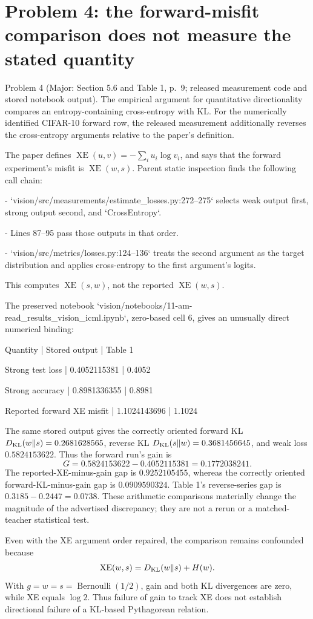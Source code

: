 \documentclass[10pt]{article}
\begin{document}
\section*{Problem 4: the forward-misfit comparison does not measure the stated quantity}
Problem 4 (Major: Section 5.6 and Table 1, p. 9; released measurement code and stored notebook output).  The empirical argument for quantitative directionality compares an entropy-containing cross-entropy with KL. For the numerically identified CIFAR-10 forward row, the released measurement additionally reverses the cross-entropy arguments relative to the paper’s definition.\par
The paper defines \(\operatorname{XE}(u,v)=-\sum_i u_i\log v_i\), and says that the forward experiment’s misfit is \(\operatorname{XE}(w,s)\). Parent static inspection finds the following call chain:\par
- `vision/src/measurements/estimate\_losses.py:272--275` selects weak output first, strong output second, and `CrossEntropy`.\par
- Lines 87–95 pass those outputs in that order.\par
- `vision/src/metrics/losses.py:124--136` treats the second argument as the target distribution and applies cross-entropy to the first argument’s logits.\par
This computes \(\operatorname{XE}(s,w)\), not the reported \(\operatorname{XE}(w,s)\).\par
The preserved notebook `vision/notebooks/11-am-read\_results\_vision\_icml.ipynb`, zero-based cell 6, gives an unusually direct numerical binding:\par
Quantity | Stored output | Table 1\par
Strong test loss | 0.4052115381 | 0.4052\par
Strong accuracy | 0.8981336355 | 0.8981\par
Reported forward XE misfit | 1.1024143696 | 1.1024\par
The same stored output gives the correctly oriented forward KL \(D_{\rm KL}(w\|s)=0.2681628565\), reverse KL \(D_{\rm KL}(s\|w)=0.3681456645\), and weak loss \(0.5824153622\). Thus the forward run’s gain is \[G=0.5824153622-0.4052115381=0.1772038241.\] The reported-XE-minus-gain gap is \(0.9252105455\), whereas the correctly oriented forward-KL-minus-gain gap is \(0.0909590324\). Table 1’s reverse-series gap is \(0.3185-0.2447=0.0738\). These arithmetic comparisons materially change the magnitude of the advertised discrepancy; they are not a rerun or a matched-teacher statistical test.\par
Even with the XE argument order repaired, the comparison remains confounded because \[\operatorname{XE}(w,s)=D_{\rm KL}(w\|s)+H(w).\] With \(g=w=s=\operatorname{Bernoulli}(1/2)\), gain and both KL divergences are zero, while XE equals \(\log2\). Thus failure of gain to track XE does not establish directional failure of a KL-based Pythagorean relation.\par
\end{document}
